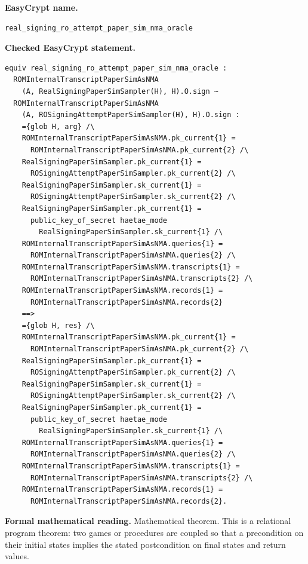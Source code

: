 \begin{formaltheorem}
\noindent\textbf{EasyCrypt name.}
\begin{lstlisting}[language=EasyCrypt,basicstyle=\ttfamily\scriptsize]
real_signing_ro_attempt_paper_sim_nma_oracle
\end{lstlisting}
\noindent\textbf{Checked EasyCrypt statement.}
\begin{lstlisting}[language=EasyCrypt,basicstyle=\ttfamily\scriptsize]
equiv real_signing_ro_attempt_paper_sim_nma_oracle :
  ROMInternalTranscriptPaperSimAsNMA
    (A, RealSigningPaperSimSampler(H), H).O.sign ~
  ROMInternalTranscriptPaperSimAsNMA
    (A, ROSigningAttemptPaperSimSampler(H), H).O.sign :
    ={glob H, arg} /\
    ROMInternalTranscriptPaperSimAsNMA.pk_current{1} =
      ROMInternalTranscriptPaperSimAsNMA.pk_current{2} /\
    RealSigningPaperSimSampler.pk_current{1} =
      ROSigningAttemptPaperSimSampler.pk_current{2} /\
    RealSigningPaperSimSampler.sk_current{1} =
      ROSigningAttemptPaperSimSampler.sk_current{2} /\
    RealSigningPaperSimSampler.pk_current{1} =
      public_key_of_secret haetae_mode
        RealSigningPaperSimSampler.sk_current{1} /\
    ROMInternalTranscriptPaperSimAsNMA.queries{1} =
      ROMInternalTranscriptPaperSimAsNMA.queries{2} /\
    ROMInternalTranscriptPaperSimAsNMA.transcripts{1} =
      ROMInternalTranscriptPaperSimAsNMA.transcripts{2} /\
    ROMInternalTranscriptPaperSimAsNMA.records{1} =
      ROMInternalTranscriptPaperSimAsNMA.records{2}
    ==>
    ={glob H, res} /\
    ROMInternalTranscriptPaperSimAsNMA.pk_current{1} =
      ROMInternalTranscriptPaperSimAsNMA.pk_current{2} /\
    RealSigningPaperSimSampler.pk_current{1} =
      ROSigningAttemptPaperSimSampler.pk_current{2} /\
    RealSigningPaperSimSampler.sk_current{1} =
      ROSigningAttemptPaperSimSampler.sk_current{2} /\
    RealSigningPaperSimSampler.pk_current{1} =
      public_key_of_secret haetae_mode
        RealSigningPaperSimSampler.sk_current{1} /\
    ROMInternalTranscriptPaperSimAsNMA.queries{1} =
      ROMInternalTranscriptPaperSimAsNMA.queries{2} /\
    ROMInternalTranscriptPaperSimAsNMA.transcripts{1} =
      ROMInternalTranscriptPaperSimAsNMA.transcripts{2} /\
    ROMInternalTranscriptPaperSimAsNMA.records{1} =
      ROMInternalTranscriptPaperSimAsNMA.records{2}.
\end{lstlisting}
\noindent\textbf{Formal mathematical reading.}
Mathematical theorem. This is a relational program theorem: two games or procedures are coupled so that a precondition on their initial states implies the stated postcondition on final states and return values.


\end{formaltheorem}
